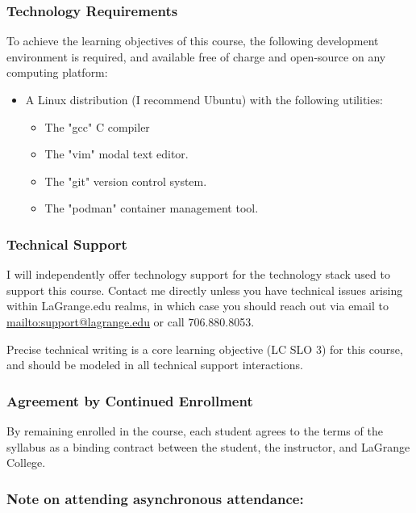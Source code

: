 \documentclass[11pt]{article}
\begin{document}
\subsubsection*{Technology Requirements}

To achieve the learning objectives of this course, the following development environment is required, and available free of charge and open-source on any computing platform:

\begin{itemize}
\item A Linux distribution (I recommend Ubuntu) with the following utilities:
\begin{itemize}
\item The "gcc" C compiler
\item The "vim" modal text editor.
\item The "git" version control system.
\item The "podman" container management tool.
\end{itemize}
\end{itemize}

\subsubsection*{Technical Support}

I will independently offer technology support for the technology stack used to support this course. Contact me directly unless you have technical issues arising within LaGrange.edu realms, in which case you should reach out via email to \href{support@lagrange.edu}{mailto:support@lagrange.edu} or call 706.880.8053.

Precise technical writing is a core learning objective (LC SLO 3) for this course, and should be modeled in all technical support interactions.

\subsubsection*{Agreement by Continued Enrollment}

By remaining enrolled in the course, each student agrees to the terms of the syllabus as a binding contract between the student, the instructor, and LaGrange College.

\subsubsection*{Note on attending asynchronous attendance:}
\end{document}

